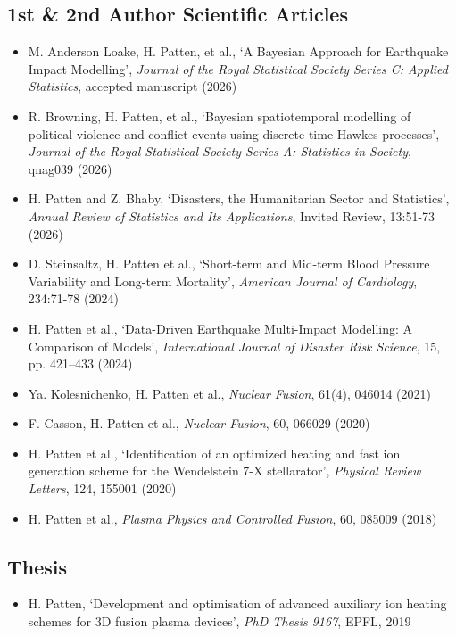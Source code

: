 \documentclass[a4paper,10pt]{article}
\begin{document}
\subsection*{1st \& 2nd Author Scientific Articles}
\begin{itemize}[leftmargin=*,noitemsep]
  \item M. Anderson Loake, H. Patten, et al., `A Bayesian Approach for Earthquake Impact Modelling', \textit{Journal of the Royal Statistical Society Series C: Applied Statistics}, accepted manuscript (2026)
  \item R. Browning, H. Patten, et al., `Bayesian spatiotemporal modelling of political violence and conflict events using discrete-time Hawkes processes', \textit{Journal of the Royal Statistical Society Series A: Statistics in Society}, qnag039 (2026)
  \item H. Patten and Z. Bhaby, `Disasters, the Humanitarian Sector and Statistics', \textit{Annual Review of Statistics and Its Applications}, Invited Review, 13:51-73 (2026)
  \item D. Steinsaltz, H. Patten et al., `Short-term and Mid-term Blood Pressure Variability and Long-term Mortality', \textit{American Journal of Cardiology}, 234:71-78 (2024)
  \item H. Patten et al., `Data-Driven Earthquake Multi-Impact Modelling: A Comparison of Models', \textit{International Journal of Disaster Risk Science}, 15, pp. 421–433 (2024)
  \item Ya. Kolesnichenko, H. Patten et al., \textit{Nuclear Fusion}, 61(4), 046014 (2021)
  \item F. Casson, H. Patten et al., \textit{Nuclear Fusion}, 60, 066029 (2020)
  \item H. Patten et al., `Identification of an optimized heating and fast ion generation scheme for the Wendelstein 7-X stellarator', \textit{Physical Review Letters}, 124, 155001 (2020)
  \item H. Patten et al., \textit{Plasma Physics and Controlled Fusion}, 60, 085009 (2018)
\end{itemize}

\subsection*{Thesis}
\begin{itemize}[leftmargin=*,noitemsep]
  \item H. Patten, `Development and optimisation of advanced auxiliary ion heating
schemes for 3D fusion plasma devices', \textit{PhD Thesis 9167}, EPFL, 2019
\end{itemize}
\end{document}
